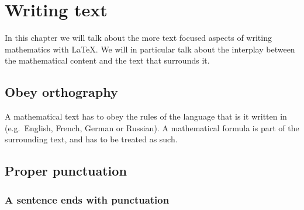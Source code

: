 


\chapter{Writing text}

In this chapter we will talk about the more text focused aspects of writing mathematics with {\LaTeX}.
We will in particular talk about the interplay between the mathematical content and the text that surrounds it.




\section{Obey orthography}
\label{a mathematical text is a text}

A mathematical text has to obey the rules of the language that is it written in (e.g.~English, French, German or Russian).
A mathematical formula is part of the surrounding text, and has to be treated as such.





\section{Proper punctuation}



\subsection{A sentence ends with punctuation}

